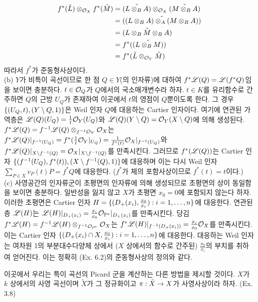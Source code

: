\begin{enumerate}[label=\tb{6.\arabic*.},itemindent=0mm,itemsep=4mm]
	\begin{align*}
	f^*(\tilde L)\otimes_{\mathcal{O}_X}f^*(\tilde M)&=\tilde{(L\otimes_BA)}\otimes_{\mathcal{O}_X}\tilde{(M\otimes_BA)}\\
	&=\tilde{((L\otimes_BA)\otimes_A(M\otimes_BA))}\\
	&=\tilde{(L\otimes_BM\otimes_BA)}\\
	&=f^*(\tilde{(L\otimes_BM)})\\
	&=f^*(\tilde L\otimes_{\mathcal{O}_Y}\tilde M)
	\end{align*}
	따라서 $f^*$가 준동형사상이다.\\
	(b) $Y$가 비특이 곡선이므로 한 점 $Q\in Y$(의 인자류)에 대하여 $f^*\mathscr{L}(Q)=\mathscr{L}(f^*Q)$임을 보이면 충분하다.
	$t\in\mathcal{O}_Q$가 $Q$에서의 국소매개변수라 하자.
	$t\in K$를 유리함수로 간주하면 $Q$의 근방 $U_Q$가 존재하여 이곳에서 $t$의 영점이 $Q$뿐이도록 한다.
	그 경우 $\{(U_Q,t),(Y\setminus Q,1)\}$은 Weil 인자 $Q$에 대응하는 Cartier 인자이다.
	여기에 연관된 가역층은 $\mathscr{L}(Q)(U_Q)=\frac{1}{t}\mathcal{O}_Y(U_Q)$와 $\mathscr{L}(Q)(Y\setminus Q)=\mathcal{O}_Y(X\setminus Q)$에 의해 생성된다.
	$f^*\mathscr{L}(Q)=f^{-1}\mathscr{L}(Q)\otimes_{f^{-1}\mathcal{O}_Y}\mathcal{O}_X$는
	$f^*\mathscr{L}(Q)|_{f^{-1}(U_Q)}=f^*(\frac{1}{t}\mathcal{O}_Y|_{U_Q})=\frac{1}{f^*(t)}\mathcal{O}_X|_{f^{-1}(U_Q)}$와
	$f^*\mathscr{L}(Q)|_{X\setminus f^{-1}(Q)}=\mathcal{O}_X|_{X\setminus f^{-1}(Q)}$를 만족시킨다.
	그러므로 $f^*(\mathscr{L}(Q))$는 Cartier 인자 $\{(f^{-1}(U_Q),f^*(t)),(X\setminus f^{-1}(Q),1)\}$에 대응하며
	이는 다시 Weil 인자 $\sum_{P\in X}v_P(t)P=f^*Q$에 대응한다. ($f^*$가 체의 포함사상이므로 $f^*(t)=t$이다.)\\
	(c) 사영공간의 인자류군이 초평면의 인자류에 의해 생성되므로 초평면의 상이 동일함을 보이면 충분하다.
	일반성을 잃지 않고 $X$가 초평면 $x_0=0$에 포함되지 않는다 하자.
	이러한 초평면은 Cartier 인자 $H=\{(D_+(x_i),\frac{x_0}{x_i}):i=1,\ldots,n\}$에 대응한다.
	연관된 층 $\mathscr{L}(H)$는 $\mathscr{L}(H)|_{D_+(x_i)}=\frac{x_i}{x_0}\mathcal{O}_{\mathbb{P}^n}|_{D_+(x_i)}$를 만족시킨다.
	당김 $f^*\mathscr{L}(H)=f^{-1}\mathscr{L}(H)\otimes_{f^{-1}\mathcal{O}_{\mathbb{P}^n}}\mathcal{O}_X$는
	$f^*\mathscr{L}(H)|_{f^{-1}(D_+(x_i))}=\frac{x_i}{x_0}\mathcal{O}_X$를 만족시킨다.
	이는 Cartier 인자 $\{(D_+(x_i)\cap X,\frac{x_0}{x_i}):i=1,\ldots,n\}$에 대응한다.
	대응하는 Weil 인자는 여차원 1의 부분대수다양체 상에서 ($X$ 상에서의 함수로 간주된) $\frac{x_0}{x_i}$의 부치를 취하여 얻어진다.
	이는 정확히 (Ex. 6.2)의 준동형사상의 정의와 같다.
	{\renewcommand{\labelenumi}{\tb{*6.\arabic{enumi}.}}
	\item {} 이곳에서 우리는 특이 곡선의 Picard 군을 계산하는 다른 방법을 제시할 것이다.
	$X$가 $k$ 상에서의 사영 곡선이며 $\tilde X$가 그 정규화이고 $\pi:\tilde X\rightarrow X$가 사영사상이라 하자. (Ex. 3.8)
}
\end{enumerate}
